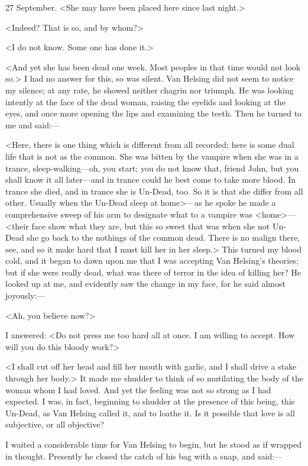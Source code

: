 \begin{diary}{27 September.}
<She may have been placed here since last night.>

<Indeed? That is so, and by whom?>

<I do not know. Some one has done it.>

<And yet she has been dead one week. Most peoples in that time would not look so.> I had no answer for this, so was silent. Van Helsing did not seem to notice my silence; at any rate, he showed neither chagrin nor triumph. He was looking intently at the face of the dead woman, raising the eyelids and looking at the eyes, and once more opening the lips and examining the teeth. Then he turned to me and said:—

<Here, there is one thing which is different from all recorded; here is some dual life that is not as the common. She was bitten by the vampire when she was in a trance, sleep-walking—oh, you start; you do not know that, friend John, but you shall know it all later—and in trance could he best come to take more blood. In trance she died, and in trance she is Un-Dead, too. So it is that she differ from all other. Usually when the Un-Dead sleep at home>—as he spoke he made a comprehensive sweep of his arm to designate what to a vampire was <home>—<their face show what they are, but this so sweet that was when she not Un-Dead she go back to the nothings of the common dead. There is no malign there, see, and so it make hard that I must kill her in her sleep.> This turned my blood cold, and it began to dawn upon me that I was accepting Van Helsing's theories; but if she were really dead, what was there of terror in the idea of killing her? He looked up at me, and evidently saw the change in my face, for he said almost joyously:—

<Ah, you believe now?>

I answered: <Do not press me too hard all at once. I am willing to accept. How will you do this bloody work?>

<I shall cut off her head and fill her mouth with garlic, and I shall drive a stake through her body.> It made me shudder to think of so mutilating the body of the woman whom I had loved. And yet the feeling was not so strong as I had expected. I was, in fact, beginning to shudder at the presence of this being, this Un-Dead, as Van Helsing called it, and to loathe it. Is it possible that love is all subjective, or all objective?

I waited a considerable time for Van Helsing to begin, but he stood as if wrapped in thought. Presently he closed the catch of his bag with a snap, and said:—


\end{diary}
